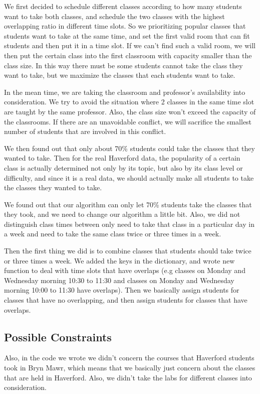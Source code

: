 \documentclass[11pt, oneside]{article}   	%
\begin{document}
We first decided to schedule different classes according to how many students want to take both classes, and schedule the two classes with the highest overlapping ratio in different time slots. So we prioritizing popular classes that students want to take at the same time, and set the first valid room that can fit students and then put it in a time slot. If we can't find such a valid room, we will then put the certain class into the first classroom with capacity smaller than the class size. In this way there must be some students cannot take the class they want to take, but we maximize the classes that each students want to take.

In the mean time, we are taking the classroom and professor's availability into consideration. We try to avoid the situation where 2 classes in the same time slot are taught by the same professor. Also, the class size won't exceed the capacity of the classrooms. If there are an unavoidable conflict, we will sacrifice the smallest number of students that are involved in this conflict.

We then found out that only about 70\% students could take the classes that they wanted to take. Then for the real Haverford data, the popularity of a certain class is actually determined not only by its topic, but also by its class level or difficulty, and since it is a real data, we should actually make all students to take the classes they wanted to take. 

We found out that our algorithm can only let 70\% students take the classes that they took, and we need to change our algorithm a little bit. Also, we did not distinguish class times between only need to take that class in a particular day in a week and need to take the same class twice or three times in a week. 

Then the first thing we did is to combine classes that students should take twice or three times a week. We added the keys in the dictionary, and wrote new function to deal with time slots that have overlaps (e.g classes on Monday and Wednesday morning 10:30 to 11:30 and classes on Monday and Wednesday morning 10:00 to 11:30 have overlaps). Then we basically assign students for classes that have no overlapping, and then assign students for classes that have overlaps. 

\subsection{Possible Constraints}
Also, in the code we wrote we didn't concern the courses that Haverford students took in Bryn Mawr, which means that we basically just concern about the classes that are held in Haverford. Also, we didn't take the labs for different classes into consideration.
\end{document}
